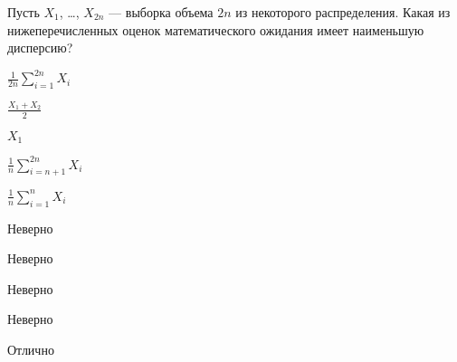
\begin{question}
Пусть \(X_1\), \ldots, \(X_{2 n}\) — выборка объема \(2 n\) из
некоторого распределения. Какая из нижеперечисленных оценок
математического ожидания имеет наименьшую дисперсию?
\begin{answerlist}
  \item \(\frac{1}{2n}\sum_{i=1}^{2n}X_i\)
  \item \(\frac{X_1+X_2}{2}\)
  \item \(X_1\)
  \item \(\frac{1}{n}\sum_{i=n+1}^{2n}X_i\)
  \item \(\frac{1}{n}\sum_{i=1}^n X_i\)
\end{answerlist}
\end{question}

\begin{solution}
\begin{answerlist}
  \item Неверно
  \item Неверно
  \item Неверно
  \item Неверно
  \item Отлично
\end{answerlist}
\end{solution}

